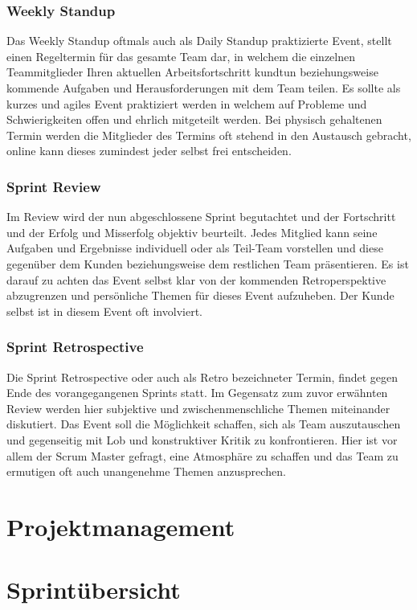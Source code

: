 \subsubsection{Weekly Standup}
Das Weekly Standup oftmals auch als Daily Standup praktizierte Event, stellt einen Regeltermin für das gesamte Team dar, in welchem die einzelnen Teammitglieder Ihren aktuellen Arbeitsfortschritt kundtun beziehungsweise kommende Aufgaben und Herausforderungen mit dem Team teilen. Es sollte als kurzes und agiles Event praktiziert werden in welchem auf Probleme und Schwierigkeiten offen und ehrlich mitgeteilt werden. Bei physisch gehaltenen Termin werden die Mitglieder des Termins oft stehend in den Austausch gebracht, online kann dieses zumindest jeder selbst frei entscheiden.

\subsubsection{Sprint Review}
Im Review wird der nun abgeschlossene Sprint begutachtet und der Fortschritt und der Erfolg und Misserfolg objektiv beurteilt. Jedes Mitglied kann seine Aufgaben und Ergebnisse individuell oder als Teil-Team vorstellen und diese gegenüber dem Kunden beziehungsweise dem restlichen Team präsentieren. Es ist darauf zu achten das Event selbst klar von der kommenden Retroperspektive abzugrenzen und persönliche Themen für dieses Event aufzuheben. Der Kunde selbst ist in diesem Event oft involviert.


\subsubsection{Sprint Retrospective}
Die Sprint Retrospective oder auch als Retro bezeichneter Termin, findet gegen Ende des vorangegangenen Sprints statt. Im Gegensatz zum zuvor erwähnten Review werden hier subjektive und zwischenmenschliche Themen miteinander diskutiert. Das Event soll die Möglichkeit schaffen, sich als Team auszutauschen und gegenseitig mit Lob und konstruktiver Kritik zu konfrontieren. Hier ist vor allem der Scrum Master gefragt, eine Atmosphäre zu schaffen und das Team zu ermutigen oft auch unangenehme Themen anzusprechen.

\section{Projektmanagement}
\label{sec:projectmanagement}


\section{Sprintübersicht}
\label{sec:sprintoverview}

